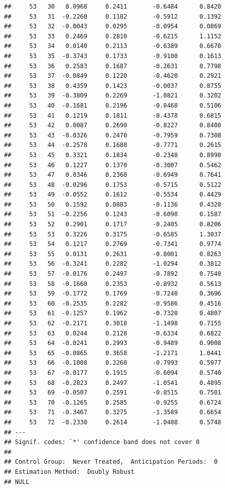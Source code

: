 \documentclass[
]{article}
\begin{document}
\begin{verbatim}
##     53   30   0.0968     0.2411       -0.6484      0.8420  
##     53   31  -0.2260     0.1182       -0.5912      0.1392  
##     53   32  -0.0043     0.0295       -0.0954      0.0869  
##     53   33   0.2469     0.2810       -0.6215      1.1152  
##     53   34   0.0140     0.2113       -0.6389      0.6670  
##     53   35  -0.3743     0.1733       -0.9100      0.1613  
##     53   36   0.2583     0.1687       -0.2631      0.7798  
##     53   37  -0.0849     0.1220       -0.4620      0.2921  
##     53   38   0.4359     0.1423       -0.0037      0.8755  
##     53   39  -0.3809     0.2269       -1.0821      0.3202  
##     53   40  -0.1681     0.2196       -0.8468      0.5106  
##     53   41   0.1219     0.1811       -0.4378      0.6815  
##     53   42   0.0087     0.2690       -0.8227      0.8400  
##     53   43  -0.0326     0.2470       -0.7959      0.7308  
##     53   44  -0.2578     0.1680       -0.7771      0.2615  
##     53   45   0.3321     0.1834       -0.2348      0.8990  
##     53   46   0.1227     0.1370       -0.3007      0.5462  
##     53   47   0.0346     0.2360       -0.6949      0.7641  
##     53   48  -0.0296     0.1753       -0.5715      0.5122  
##     53   49  -0.0552     0.1612       -0.5534      0.4429  
##     53   50   0.1592     0.0883       -0.1136      0.4320  
##     53   51  -0.2256     0.1243       -0.6098      0.1587  
##     53   52   0.2901     0.1717       -0.2405      0.8206  
##     53   53   0.3226     0.3175       -0.6585      1.3037  
##     53   54   0.1217     0.2769       -0.7341      0.9774  
##     53   55   0.0131     0.2631       -0.8001      0.8263  
##     53   56  -0.3241     0.2282       -1.0294      0.3812  
##     53   57  -0.0176     0.2497       -0.7892      0.7540  
##     53   58  -0.1660     0.2353       -0.8932      0.5613  
##     53   59  -0.1772     0.1769       -0.7240      0.3696  
##     53   60  -0.2535     0.2282       -0.9586      0.4516  
##     53   61  -0.1257     0.1962       -0.7320      0.4807  
##     53   62  -0.2171     0.3018       -1.1498      0.7155  
##     53   63   0.0244     0.2128       -0.6334      0.6822  
##     53   64  -0.0241     0.2993       -0.9489      0.9008  
##     53   65  -0.0865     0.3658       -1.2171      1.0441  
##     53   66  -0.1008     0.2260       -0.7993      0.5977  
##     53   67  -0.0177     0.1915       -0.6094      0.5740  
##     53   68  -0.2823     0.2497       -1.0541      0.4895  
##     53   69  -0.0507     0.2591       -0.8515      0.7501  
##     53   70  -0.1265     0.2585       -0.9255      0.6724  
##     53   71  -0.3467     0.3275       -1.3589      0.6654  
##     53   72  -0.2330     0.2614       -1.0408      0.5748  
## ---
## Signif. codes: `*' confidence band does not cover 0
## 
## Control Group:  Never Treated,  Anticipation Periods:  0
## Estimation Method:  Doubly Robust
## NULL
\end{verbatim}
\end{document}
